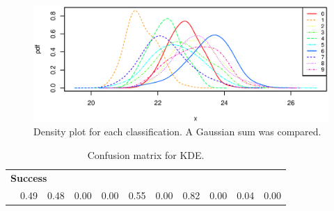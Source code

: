 \begin{figure}[H]
    \includegraphics[width = \textwidth]{graphics/kde_graphs}
    \caption{Density plot for each classification. A Gaussian sum was compared.}
    \label{fig:pdf_gaussian_kde}
\end{figure}

\begin{table}[H]
\centering
         \begin{subtable}{0.8\textwidth}
        \centering
    \end{subtable}
    
    \begin{subtable}{0.05\textwidth}
        \flushright
    \end{subtable}
    \begin{subtable}{0.8\textwidth}
            \centering
                \begin{tabular}{l|*{10}{c}}
                    
                    \multicolumn{11}{l}{\bf Success}\\
                    \multicolumn{1}{l}{}&0.49&0.48&0.00&0.00&0.55&0.00&0.82&0.00&0.04&0.00\\
                \end{tabular}
    \end{subtable}
    \caption{Confusion matrix for KDE.}
    \label{tb:kde_confus}
\end{table}
